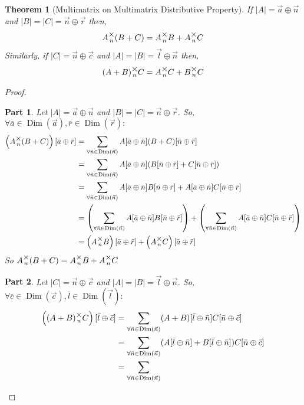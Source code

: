 \documentclass[12pt]{book}
\theoremstyle{definition}
\theoremstyle{plain}
\newtheorem{theorem}{Theorem}[chapter]
\theoremstyle{ppart}
\newtheorem{ppart}{Part}
\theoremstyle{case}
\theoremstyle{solution}
\DeclareMathOperator{\Dim}{Dim}
\newcommand{\mmult}[1]{\text{\raisebox{1ex}{$\underset{#1}{\times}$}}}
\begin{document}
\begin{landscape}
\begin{theorem}[Multimatrix on Multimatrix Distributive Property]
If $|A| = \vec{a} \oplus \vec{n}$ and $|B|=|C|=\vec{n} \oplus \vec{r}$ then,
\[ A \mmult{n} (B + C) = A \mmult{n} B + A \mmult{n} C \]
Similarly, if $|C| = \vec{n} \oplus \vec{c}$ and $|A|=|B|=\vec{l} \oplus \vec{n}$ then,
\[ (A + B) \mmult{n} C = A \mmult{n} C + B \mmult{n} C \]
\end{theorem}
\begin{proof}
\begin{ppart}
Let $|A| = \vec{a} \oplus \vec{n}$ and $|B|=|C|=\vec{n} \oplus \vec{r}$.
So, $\forall \bar{a} \in \Dim(\vec{a}), \bar{r} \in \Dim(\vec{r}) :$
\begin{align*}
 \left( A \mmult{n} (B + C) \right)[\bar{a} \oplus \bar{r}]
 &= \sum_{\forall \bar{n} \in \Dim(\vec{n})}
    A[\bar{a} \oplus \bar{n}] (B + C)[\bar{n} \oplus \bar{r}] \\
 &= \sum_{\forall \bar{n} \in \Dim(\vec{n})}
    A[\bar{a} \oplus \bar{n}] (B[\bar{n} \oplus \bar{r}] + C[\bar{n} \oplus \bar{r}]) \\
 &= \sum_{\forall \bar{n} \in \Dim(\vec{n})}
    A[\bar{a} \oplus \bar{n}] B[\bar{n} \oplus \bar{r}]
  + A[\bar{a} \oplus \bar{n}]C[\bar{n} \oplus \bar{r}] \\
 &= \left( \sum_{\forall \bar{n} \in \Dim(\vec{n})}
    A[\bar{a} \oplus \bar{n}] B[\bar{n} \oplus \bar{r}] \right)
    +
    \left( \sum_{\forall \bar{n} \in \Dim(\vec{n})}
    A[\bar{a} \oplus \bar{n}]C[\bar{n} \oplus \bar{r}] \right) \\
 &= \left( A \mmult{n} B \right)[\bar{a} \oplus \bar{r}] +
     \left( A \mmult{n} C \right)[\bar{a} \oplus \bar{r}]
\end{align*}
So $A \mmult{n} (B + C) = A \mmult{n} B + A \mmult{n} C$
\end{ppart}
\begin{ppart}
Let $|C| = \vec{n} \oplus \vec{c}$ and $|A|=|B|=\vec{l} \oplus \vec{n}$.
So, $\forall \bar{c} \in \Dim(\vec{c}), \bar{l} \in \Dim(\vec{l}) :$
\begin{align*}
 \left( (A + B) \mmult{n} C \right)[\bar{l} \oplus \bar{c}]
 &= \sum_{\forall \bar{n} \in \Dim(\vec{n})}
    (A+B)[\bar{l} \oplus \bar{n}] C[\bar{n} \oplus \bar{c}] \\
 &= \sum_{\forall \bar{n} \in \Dim(\vec{n})}
    (A[\bar{l} \oplus \bar{n}]+B[\bar{l} \oplus \bar{n}])C[\bar{n} \oplus \bar{c}] \\
 &= \sum_{\forall \bar{n} \in \Dim(\vec{n})}

\end{align*}
\end{ppart}
\end{proof}
\end{landscape}
\end{document}
